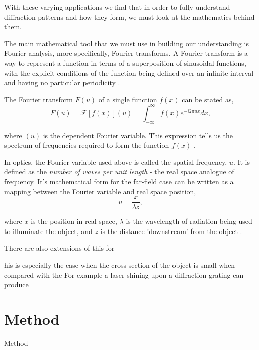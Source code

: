 \documentclass[twocolumn]{revtex4}
\begin{document}
With these varying applications we find that in order to fully understand diffraction patterns and how they form, we must look at the mathematics behind them. 

The main mathematical tool that we must use in building our understanding is Fourier analysis, more specifically, Fourier transforms. A Fourier transform is a way to represent a function in terms of a superposition of sinusoidal functions, with the explicit conditions of the function being defined over an infinite interval and having no particular periodicity \cite{mathmethods}.

The Fourier transform $F(u)$ of a single function $f(x)$ can be stated as,
\begin{equation}
F(u) = \mathcal{F}[f(x)](u) = \int_{-\infty}^\infty f(x) e^{-i2\pi ux}dx,
\end{equation}

where $(u)$ is the dependent Fourier variable. This expression tells us the spectrum of frequencies required to form the function $f(x)$ \cite{of2f}.

In optics, the Fourier variable used above is called the spatial frequency, $u$. It is defined as the \textsl{number of waves per unit length} - the real space analogue of frequency. It's mathematical form for the far-field case can be written as a mapping between the Fourier variable and real space position,
\begin{equation}
u=\frac{x}{\lambda z},
\end{equation}

where $x$ is the position in real space, $\lambda$ is the wavelength of radiation being used to illuminate the object, and $z$ is the distance 'downstream' from the object \cite{of2f}.

There are also extensions of this for 

his is especially the case when the cross-section of the object is small when compared with the  For example a laser shining upon a diffraction grating can produce


\vspace{-3ex}
\section{Method} 
\vspace{-2ex}

Method
\end{document}

